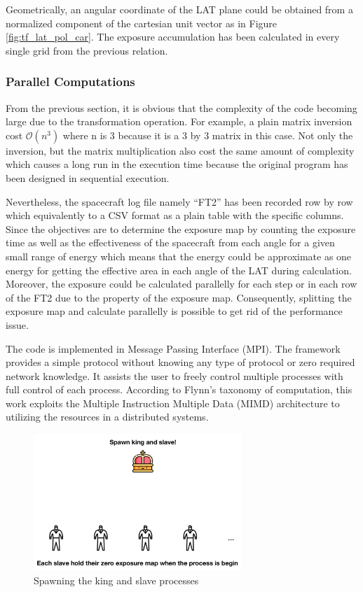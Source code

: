 Geometrically, an angular coordinate of the LAT plane could be obtained from
a normalized component of the cartesian unit vector as in Figure
\ref{fig:tf_lat_pol_car}. The exposure accumulation has been
calculated in every single grid from the previous relation.

\subsubsection{Parallel Computations}

From the previous section, it is obvious that the complexity of 
the code becoming large due to the transformation operation.
For example, a plain matrix inversion cost $\mathcal{O}(n^3)$ where 
n is 3 because it is a 3 by 3 matrix in this case. Not only the inversion,
but the matrix multiplication also cost the same amount of
complexity which causes a long run in the execution time because 
the original program has been designed in sequential execution.

Nevertheless, the spacecraft log file namely ``FT2'' has been recorded
row by row which equivalently to a CSV format as a plain table with 
the specific columns. Since the objectives are to determine the exposure map
by counting the exposure time as well as the effectiveness of the spacecraft 
from each angle for a given small range of energy which means that 
the energy could be approximate as one energy for getting the effective 
area in each angle of the LAT during calculation. Moreover, the exposure 
could be calculated parallelly for each step or in each row of the FT2 due to 
the property of the exposure map. Consequently, splitting the exposure map 
and calculate parallelly is possible to get rid of the performance issue.

The code is implemented
in Message Passing Interface (MPI). The framework provides 
a simple protocol without knowing any type of protocol or 
zero required network knowledge. It assists the user to 
freely control multiple processes with full control of 
each process. According to Flynn's taxonomy of computation,
this work exploits the Multiple Instruction Multiple Data (MIMD)
architecture to utilizing the resources in a distributed systems.

\begin{figure}[h!]
    \centering
    \includegraphics[width=0.7\textwidth]{content/methodology/figures/ms1}
    \caption{Spawning the king and slave processes}
    \label{fig:ms1}
\end{figure}

